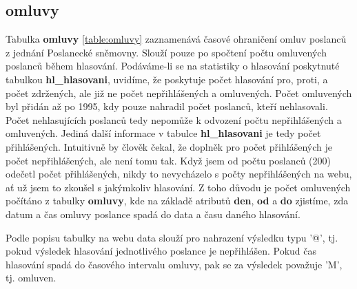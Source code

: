 \subsection*{omluvy}

Tabulka \textbf{omluvy} \ref{table:omluvy} zaznamenává časové ohraničení omluv poslanců z jednání Poslanecké sněmovny. Slouží pouze po spočtení počtu omluvených poslanců během hlasování. Podáváme-li se na statistiky o hlasování poskytnuté tabulkou \textbf{hl\_hlasovani}, uvidíme, že poskytuje počet hlasování pro, proti, a počet zdržených, ale již ne počet nepřihlášených a omluvených. Počet omluvených byl přidán až po 1995, kdy pouze nahradil počet poslanců, kteří nehlasovali. Počet nehlasujících poslanců tedy nepomůže k odvození počtu nepřihlášených a omluvených. Jediná další informace v tabulce \textbf{hl\_hlasovani} je tedy počet přihlášených. Intuitivně by člověk čekal, že doplněk pro počet přihlášených je počet nepřihlášených, ale není tomu tak. Když jsem od počtu poslanců (200) odečetl počet přihlášených, nikdy to nevycházelo s počty nepřihlášených na webu, ať už jsem to zkoušel s jakýmkoliv hlasování. Z toho důvodu je počet omluvených počítáno z tabulky \textbf{omluvy}, kde na základě atributů \textbf{den}, \textbf{od} a \textbf{do} zjistíme, zda datum a čas omluvy poslance spadá do data a času daného hlasování.

Podle popisu tabulky na webu data slouží pro nahrazení výsledku typu '@', tj. pokud výsledek hlasování jednotlivého poslance je nepřihlášen. Pokud čas hlasování spadá do časového intervalu omluvy, pak se za výsledek považuje 'M', tj. omluven.

